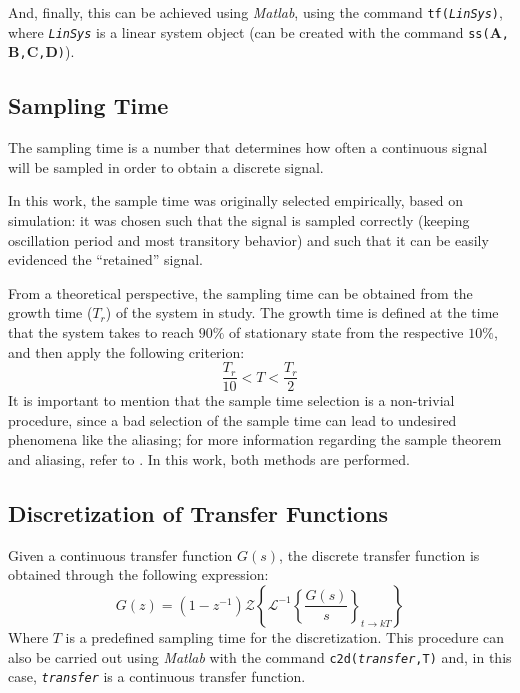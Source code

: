 And, finally, this can be achieved using \textit{Matlab}, using the command \texttt{tf(\textit{LinSys})}, where \texttt{\textit{LinSys}} is a linear system object (can be created with the command \texttt{ss($\mathbf{A}$,$\mathbf{B}$,$\mathbf{C}$,$\mathbf{D}$)}).

\subsection{Sampling Time}\label{sec:sampling}
The sampling time is a number that determines how often a continuous signal will be sampled in order to obtain a discrete signal.

In this work, the sample time was originally selected empirically, based on simulation: it was chosen such that the signal is sampled correctly (keeping oscillation period and most transitory behavior) and such that it can be easily evidenced the ``retained'' signal.

From a theoretical perspective, the sampling time can be obtained from the growth time ($T_r$) of the system in study. The growth time is defined at the time that the system takes to reach $90\%$ of stationary state from the respective $10\%$, and then apply the following criterion:
\begin{equation}
    \dfrac{T_r}{10}<T<\dfrac{T_r}{2}
\end{equation}
It is important to mention that the sample time selection is a non-trivial procedure, since a bad selection of the sample time can lead to undesired phenomena like the aliasing; for more information regarding the sample theorem and aliasing, refer to \cite[pp. 34-54]{diniz2010digital}. In this work, both methods are performed.

\subsection{Discretization of Transfer Functions}\label{sec:c2d}
Given a continuous transfer function $G(s)$, the discrete transfer function is obtained through the following expression:
\begin{equation}
    G(z)=(1-z^{-1})\mathcal{Z}\left\{\mathcal{L}^{-1}\left\{\dfrac{G(s)}{s}\right\}_{t\rightarrow kT}\right\}
\end{equation}
Where $T$ is a predefined sampling time for the discretization. This procedure can also be carried out using \textit{Matlab} with the command \texttt{c2d(\textit{transfer},T)} and, in this case, \texttt{\textit{transfer}} is a continuous transfer function.

